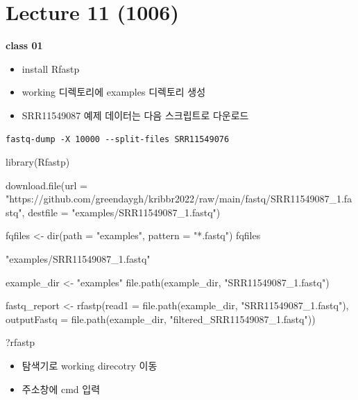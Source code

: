 \documentclass[
]{book}
\newenvironment{Shaded}{\begin{snugshade}}{\end{snugshade}}
\newcommand{\AttributeTok}[1]{\textcolor[rgb]{0.77,0.63,0.00}{#1}}
\newcommand{\FunctionTok}[1]{\textcolor[rgb]{0.00,0.00,0.00}{#1}}
\newcommand{\NormalTok}[1]{#1}
\newcommand{\OtherTok}[1]{\textcolor[rgb]{0.56,0.35,0.01}{#1}}
\newcommand{\StringTok}[1]{\textcolor[rgb]{0.31,0.60,0.02}{#1}}
\providecommand{\tightlist}{%
  \setlength{\itemsep}{0pt}\setlength{\parskip}{0pt}}
\begin{document}
\hypertarget{lecture-11-1006}{%
\section{Lecture 11 (1006)}\label{lecture-11-1006}}

\textbf{class 01}

\begin{itemize}
\tightlist
\item
  install Rfastp
\item
  working 디렉토리에 examples 디렉토리 생성
\item
  SRR11549087 예제 데이터는 다음 스크립트로 다운로드
\end{itemize}

\begin{verbatim}
fastq-dump -X 10000 --split-files SRR11549076
\end{verbatim}

\begin{Shaded}
\begin{Highlighting}[]
\FunctionTok{library}\NormalTok{(Rfastp)}

\FunctionTok{download.file}\NormalTok{(}\AttributeTok{url =} \StringTok{"https://github.com/greendaygh/kribbr2022/raw/main/fastq/SRR11549087\_1.fastq"}\NormalTok{, }\AttributeTok{destfile =} \StringTok{"examples/SRR11549087\_1.fastq"}\NormalTok{)}

\NormalTok{fqfiles }\OtherTok{\textless{}{-}} \FunctionTok{dir}\NormalTok{(}\AttributeTok{path =} \StringTok{"examples"}\NormalTok{, }\AttributeTok{pattern =} \StringTok{"*.fastq"}\NormalTok{)}
\NormalTok{fqfiles }

\StringTok{"examples/SRR11549087\_1.fastq"}

\NormalTok{example\_dir }\OtherTok{\textless{}{-}} \StringTok{"examples"}
\FunctionTok{file.path}\NormalTok{(example\_dir, }\StringTok{"SRR11549087\_1.fastq"}\NormalTok{)}

\NormalTok{fastq\_report }\OtherTok{\textless{}{-}} \FunctionTok{rfastp}\NormalTok{(}\AttributeTok{read1 =} \FunctionTok{file.path}\NormalTok{(example\_dir, }\StringTok{"SRR11549087\_1.fastq"}\NormalTok{),}
       \AttributeTok{outputFastq =} \FunctionTok{file.path}\NormalTok{(example\_dir, }\StringTok{"filtered\_SRR11549087\_1.fastq"}\NormalTok{))}

\NormalTok{?rfastp}
\end{Highlighting}
\end{Shaded}

\begin{itemize}
\tightlist
\item
  탐색기로 working direcotry 이동
\item
  주소창에 cmd 입력
\end{itemize}
\end{document}
